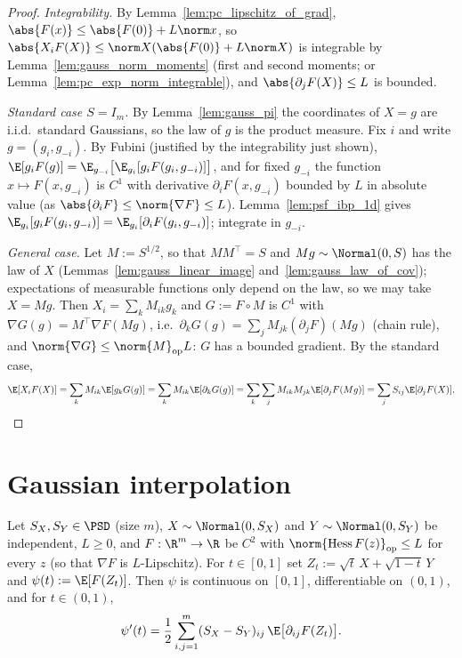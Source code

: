 \begin{proof}
\leanok
{}
\emph{Integrability.} By Lemma~\ref{lem:pc_lipschitz_of_grad}, $\abs{F(x)}\le\abs{F(0)}+L\norm x$,
so $\abs{X_iF(X)}\le\norm X(\abs{F(0)}+L\norm X)$ is integrable by
Lemma~\ref{lem:gauss_norm_moments} (first and second moments; or
Lemma~\ref{lem:pc_exp_norm_integrable}), and $\abs{\partial_jF(X)}\le L$ is bounded.

\emph{Standard case $S = I_m$.} By Lemma~\ref{lem:gauss_pi} the coordinates of $X = g$ are
i.i.d.\ standard Gaussians, so the law of $g$ is the product measure. Fix $i$ and write
$g = (g_i, g_{-i})$. By Fubini (justified by the integrability just shown),
$\E[g_iF(g)] = \E_{g_{-i}}\big[\E_{g_i}[g_i F(g_i,g_{-i})]\big]$, and for fixed $g_{-i}$ the
function $x\mapsto F(x,g_{-i})$ is $C^1$ with derivative $\partial_iF(x,g_{-i})$ bounded by
$L$ in absolute value (as $\abs{\partial_iF}\le\norm{\nabla F}\le L$). Lemma~\ref{lem:psf_ibp_1d}
gives $\E_{g_i}[g_iF(g_i,g_{-i})] = \E_{g_i}[\partial_iF(g_i,g_{-i})]$; integrate in $g_{-i}$.

\emph{General case.} Let $M := S^{1/2}$, so that $MM^\top = S$ and $Mg\sim\Normal(0,S)$ has the
law of $X$ (Lemmas~\ref{lem:gauss_linear_image} and~\ref{lem:gauss_law_of_cov}); expectations
of measurable functions only depend on the law, so we may take $X = Mg$. Then
$X_i = \sum_k M_{ik}g_k$ and $G := F\circ M$ is $C^1$ with
$\nabla G(g) = M^\top\nabla F(Mg)$, i.e.\ $\partial_kG(g) = \sum_j M_{jk}(\partial_jF)(Mg)$
(chain rule), and $\norm{\nabla G}\le\norm{M}_{\mathrm{op}}L$: $G$ has a bounded gradient. By
the standard case,
\[
  \E[X_iF(X)] = \sum_k M_{ik}\E[g_kG(g)] = \sum_k M_{ik}\E[\partial_kG(g)]
  = \sum_k\sum_j M_{ik}M_{jk}\E[\partial_jF(Mg)] = \sum_j S_{ij}\E[\partial_jF(X)].
\]
\end{proof}

\section{Gaussian interpolation}
\label{sec:pre_sudakov_interp}

\begin{lemma}\label{lem:interpolation_derivative}
\leanok
{}
Let $S_X, S_Y \in \PSD$ (size $m$), $X\sim\Normal(0,S_X)$ and $Y\sim\Normal(0,S_Y)$ be
independent, $L\ge0$, and $F : \R^m\to\R$ be $C^2$ with
$\norm{\mathrm{Hess}\,F(z)}_{\mathrm{op}}\le L$ for every $z$ (so that $\nabla F$ is
$L$-Lipschitz). For $t\in[0,1]$ set
$Z_t := \sqrt t\,X + \sqrt{1-t}\,Y$ and $\psi(t) := \E[F(Z_t)]$. Then $\psi$ is continuous on
$[0,1]$, differentiable on $(0,1)$, and for $t\in(0,1)$,
\[
  \psi'(t) = \frac12\sum_{i,j=1}^m (S_X - S_Y)_{ij}\,\E\big[\partial_{ij}F(Z_t)\big].
\]
\end{lemma}

